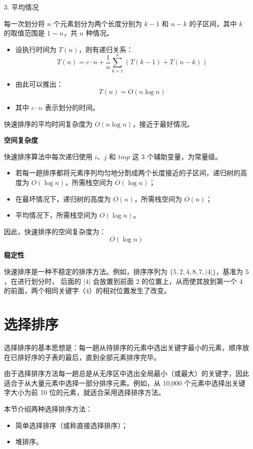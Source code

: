 \documentclass[lang=cn,newtx,10pt,scheme=chinese]{elegantbook}
\begin{document}
3. 平均情况  

   每一次划分将 $n$ 个元素划分为两个长度分别为 $k-1$ 和 $n-k$ 的子区间，其中 $k$ 的取值范围是 $1 \sim n$，共 $n$ 种情况。  
   \begin{itemize}
     \item 设执行时间为 $T(n)$，则有递归关系：
       \[
       T(n) = c \cdot n + \frac{1}{n} \sum_{k=1}^n \left(T(k-1) + T(n-k)\right)
       \]
     \item 由此可以推出：
       \[
       T(n) = O(n \log n)
       \]
     \item 其中 $c \cdot n$ 表示划分的时间。
   \end{itemize}

快速排序的平均时间复杂度为 $O(n \log n)$，接近于最好情况。


\textbf{空间复杂度}  

快速排序算法中每次递归使用 $i$、$j$ 和 $tmp$ 这 3 个辅助变量，为常量级。  
\begin{itemize}
  \item 若每一趟排序都将元素序列均匀地分割成两个长度接近的子区间，递归树的高度为 $O(\log n)$，所需栈空间为 $O(\log n)$；
  \item 在最坏情况下，递归树的高度为 $O(n)$，所需栈空间为 $O(n)$；
  \item 平均情况下，所需栈空间为 $O(\log n)$。
\end{itemize}
因此，快速排序的空间复杂度为：
\[
O(\log n)
\]


\textbf{稳定性}  

快速排序是一种不稳定的排序方法。例如，排序序列为 $\{5, 2, 4, 8, 7, |4|\}$，基准为 $5$，在进行划分时，
后面的 $|4|$ 会放置到前面 $2$ 的位置上，从而使其放到第一个 $4$ 的前面，两个相同关键字（$4$）的相对位置发生了改变。

\section{选择排序}
选择排序的基本思想是：每一趟从待排序的元素中选出关键字最小的元素，顺序放在已排好序的子表的最后，直到全部元素排序完毕。

由于选择排序方法每一趟总是从无序区中选出全局最小（或最大）的关键字，因此适合于从大量元素中选择一部分排序元素。例如，从 10,000 个元素中选择出关键字大小为前 10 位的元素，就适合采用选择排序方法。

本节介绍两种选择排序方法：
\begin{itemize}
  \item 简单选择排序（或称直接选择排序）；
  \item 堆排序。
\end{itemize}
\end{document}
